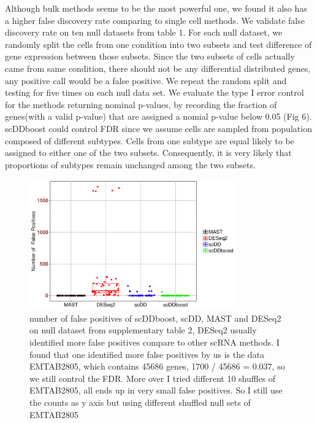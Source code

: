 \documentclass[aoas,preprint]{imsart}
\begin{document}
Although bulk methods seems to be the most powerful one, we found it also has a higher false discovery rate comparing to single cell methods. We validate false discovery rate on ten null datasets from table 1. For each null dataset, we randomly split the cells from one condition into two subsets and test difference of gene expression between those subsets. Since the two subsets of cells actually came from same condition, there should not be any differential distributed genes, any positive call would be a false positive. We repeat the random split and testing for five times on each null data set. We evaluate the type I error control for the methods returning nominal p-values, by recording the fraction of genes(with a valid p-value) that are assigned a nomial p-value below 0.05 (Fig 6).\\
scDDboost could control FDR since we assume cells are sampled from population composed of different subtypes. Cells from one subtype are equal likely to be assigned to either one of the two subsets. Consequently, it is very likely that proportions of subtypes remain unchanged among the two subsets.



\begin{figure}[H]
\includegraphics[width = 0.8\textwidth]{Figs/fdrCounts.pdf}
 \caption{number of false positives of scDDboost, scDD, MAST and DESeq2 on null dataset from supplementary table 2, DESeq2 usually identified more false positives compare to other scRNA methods.  I found that one identified more false positives by us is the data EMTAB2805, which contains 45686 genes, 1700 / 45686 = 0.037, so we still control the FDR. More over I tried different 10 shuffles of EMTAB2805, all ends up in very small false positives. So I still use the counts as y axis but using different shuffled null sets of EMTAB2805}
  \label{fig:7}
\end{figure}
\end{document}
